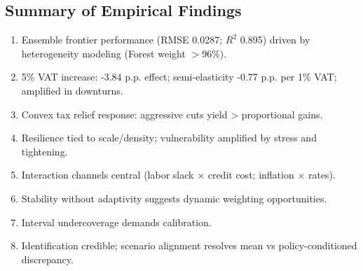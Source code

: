 \subsection{Summary of Empirical Findings}
\begin{enumerate}
  \item Ensemble frontier performance (RMSE 0.0287; $R^2$ 0.895) driven by heterogeneity modeling (Forest weight $>$96\%).
  \item 5\% VAT increase: -3.84 p.p. effect; semi-elasticity -0.77 p.p. per 1\% VAT; amplified in downturns.
  \item Convex tax relief response: aggressive cuts yield > proportional gains.
  \item Resilience tied to scale/density; vulnerability amplified by stress and tightening.
  \item Interaction channels central (labor slack $\times$ credit cost; inflation $\times$ rates).
  \item Stability without adaptivity suggests dynamic weighting opportunities.
  \item Interval undercoverage demands calibration.
  \item Identification credible; scenario alignment resolves mean vs policy-conditioned discrepancy.
\end{enumerate}
